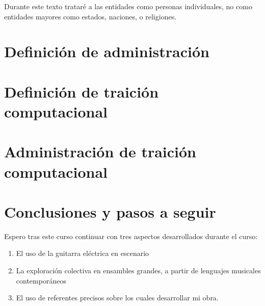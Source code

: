\documentclass{article}
\begin{document}
Durante este texto trataré a las entidades como personas individuales, no como entidades mayores como estados, naciones, o religiones.

\clearpage

\section{Definición de administración}

\clearpage

\section{Definición de traición computacional}


\clearpage

\section{Administración de traición computacional}

\clearpage

\section{Conclusiones y pasos a seguir}

Espero tras este curso continuar con tres aspectos desarrollados durante el curso:

\begin{enumerate}
    \item El uso de la guitarra eléctrica en escenario
    \item La exploración colectiva en ensambles grandes, a partir de lenguajes musicales contemporáneos
    \item El uso de referentes precisos sobre los cuales desarrollar mi obra.
\end{enumerate}



\clearpage

\printbibliography[title={Bibliografía}, heading=bibintoc]
\end{document}
